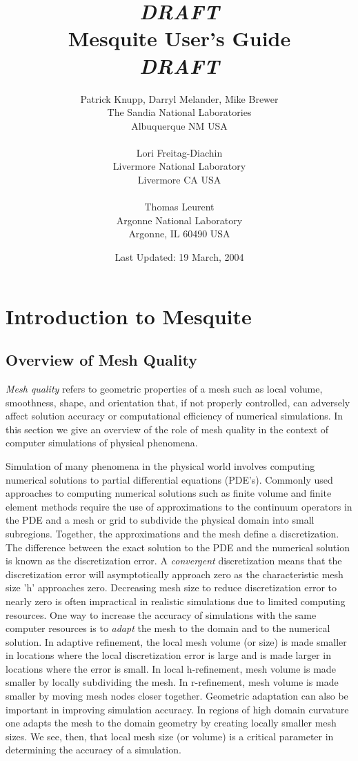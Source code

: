 \documentclass[letter]{report}
\title{ {\LARGE\bf \emph{DRAFT} \\
        Mesquite User's Guide\\
                 \emph{DRAFT} }}
\author{Patrick Knupp, Darryl Melander, Mike Brewer \\
The Sandia National Laboratories \\
Albuquerque NM USA \\
 \\
Lori Freitag-Diachin \\
Livermore National Laboratory \\
Livermore CA USA \\
  \\
Thomas Leurent \\
Argonne National Laboratory \\
Argonne, IL 60490 USA}
\date{Last Updated: 19 March, 2004}
\begin{document}
\maketitle

\tableofcontents

\listoffigures

\listoftables

\chapter{Introduction to Mesquite} 

\section{Overview of Mesh Quality}

\hskip 0.25in {\it Mesh quality} refers to geometric properties of a mesh such as 
local volume, smoothness, shape, and orientation that, if not properly 
controlled, 
can adversely affect solution accuracy or computational efficiency of numerical simulations. In this section we give an overview of the role of mesh quality 
in the context of computer simulations of physical phenomena. \newline

Simulation of many phenomena in the physical world involves computing 
numerical 
solutions to partial differential equations (PDE's). Commonly used approaches 
to computing  numerical solutions such as finite volume and finite 
element methods require the use of approximations to the continuum operators 
in the PDE and a mesh or grid to subdivide the physical domain into small 
subregions. Together, the approximations and the mesh define a discretization. 
The difference between the exact solution to the PDE and the numerical solution is known as the discretization error. A {\it convergent} 
discretization means that the discretization error will asymptotically 
approach zero as the characteristic mesh size 'h' 
approaches zero. Decreasing mesh size to reduce discretization error to 
nearly zero is often impractical in realistic simulations due to limited 
computing resources. One way to increase the accuracy of simulations with the 
same computer resources is to {\it adapt} the mesh to the domain and to the 
numerical solution. In adaptive refinement, the local mesh volume (or size) 
is made smaller in locations where the local discretization error is large and 
is made larger in locations where the error is small. In local h-refinement, 
mesh volume is made smaller by locally subdividing the mesh. In 
r-refinement, mesh volume is made smaller by moving mesh nodes closer together.
Geometric adaptation can also be important in improving simulation accuracy. In regions of high domain curvature one adapts the mesh to the domain geometry by creating locally smaller mesh sizes. We see, then, that local mesh size (or volume) is a critical parameter in determining the accuracy of a simulation. \newline
\end{document}
